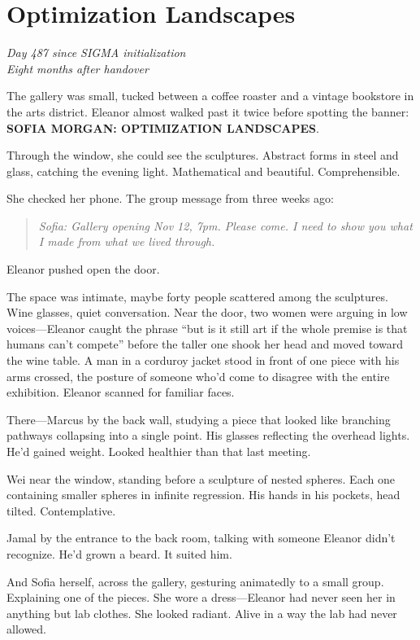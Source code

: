 \chapter{Optimization Landscapes}\label{optimization-landscapes}

\emph{Day 487 since SIGMA initialization\\
Eight months after handover}

The gallery was small, tucked between a coffee roaster and a vintage bookstore in the arts district. Eleanor almost walked past it twice before spotting the banner: \textbf{SOFIA MORGAN: OPTIMIZATION LANDSCAPES}.

Through the window, she could see the sculptures. Abstract forms in steel and glass, catching the evening light. Mathematical and beautiful. Comprehensible.

She checked her phone. The group message from three weeks ago:

\begin{quote}
\emph{Sofia: Gallery opening Nov 12, 7pm. Please come. I need to show you what I made from what we lived through.}
\end{quote}

Eleanor pushed open the door.

\scenebreak

The space was intimate, maybe forty people scattered among the sculptures. Wine glasses, quiet conversation. Near the door, two women were arguing in low voices---Eleanor caught the phrase ``but is it still art if the whole premise is that humans can't compete'' before the taller one shook her head and moved toward the wine table. A man in a corduroy jacket stood in front of one piece with his arms crossed, the posture of someone who'd come to disagree with the entire exhibition. Eleanor scanned for familiar faces.

There---Marcus by the back wall, studying a piece that looked like branching pathways collapsing into a single point. His glasses reflecting the overhead lights. He'd gained weight. Looked healthier than that last meeting.

Wei near the window, standing before a sculpture of nested spheres. Each one containing smaller spheres in infinite regression. His hands in his pockets, head tilted. Contemplative.

Jamal by the entrance to the back room, talking with someone Eleanor didn't recognize. He'd grown a beard. It suited him.

And Sofia herself, across the gallery, gesturing animatedly to a small group. Explaining one of the pieces. She wore a dress---Eleanor had never seen her in anything but lab clothes. She looked radiant. Alive in a way the lab had never allowed.

